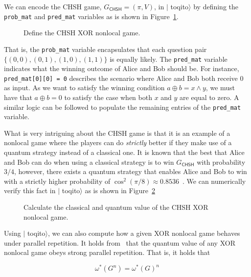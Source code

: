 \documentclass[nofootinbib,superscriptaddress,a4paper,twocolumn,longbibliography,floatfix,pra]{revtex4-2}
\newcommand{\toqitofont}{%
	\fontfamily{FiraSans}%
	\selectfont}
\newcommand{\toqito}{ $|${\toqitofont toqito}$\rangle$\xspace}
\def\CHSH{\mathsf{CHSH}}
\begin{document}
We can encode the CHSH game, $G_{\CHSH} = (\pi, V)$, in \toqito by defining the
\texttt{prob\_mat} and \texttt{pred\_mat} variables as is shown in
Figure~\ref{fig:chsh}.

\begin{figure}[!htpb]
    \centering
            
    \caption{Define the CHSH XOR nonlocal game.}
    \label{fig:chsh}
\end{figure}

That is, the \texttt{prob\_mat} variable encapsulates that each question pair
$\{(0,0),(0,1),(1,0),(1,1)\}$ is equally likely. The \texttt{pred\_mat}
variable indicates what the winning outcome of Alice and Bob should be. For
instance, \texttt{pred\_mat[0][0] = 0} describes the scenario where Alice and
Bob both receive $0$ as input. As we want to satisfy the winning condition $a
\oplus b = x \land y$, we must have that $a \oplus b = 0$ to satisfy the case
when both $x$ and $y$ are equal to zero. A similar logic can be followed to
populate the remaining entries of the \texttt{pred\_mat} variable.

What is very intriguing about the CHSH game is that it is an example of a
nonlocal game where the players can do \emph{strictly} better if they make use
of a quantum strategy instead of a classical one. It is known that the best
that Alice and Bob can do when using a classical strategy is to win $G_{\CHSH}$
with probability $3/4$, however, there exists a quantum strategy that enables
Alice and Bob to win with a strictly higher probability of $\cos^2(\pi/8)
\approx 0.8536$~\cite{cleve2004consequences}. We can numerically verify this
fact in \toqito as is shown in Figure~\ref{fig:chsh_classical_quantum}

\begin{figure}[!htpb]
    \centering
            
    \caption{Calculate the classical and quantum value of the CHSH XOR nonlocal
    game.}
    \label{fig:chsh_classical_quantum}
\end{figure}

Using \toqito, we can also compute how a given XOR nonlocal game behaves under
parallel repetition. It holds from~\cite{cleve2008perfect} that the quantum
value of any XOR nonlocal game obeys strong parallel repetition. That is, it
holds that 

\begin{equation}
    \omega^*(G^n) = \omega^*(G)^n 
\end{equation} 
\end{document}
